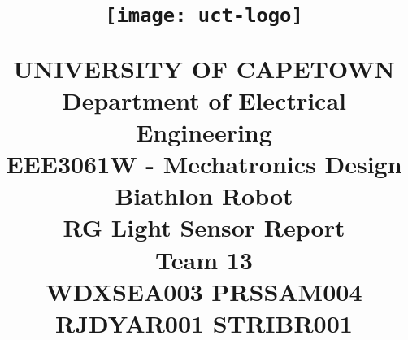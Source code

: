 
\newcommand{\hmwkTitle}{RG Light Sensor Report} %
\newcommand{\hmwkDueDate}{Wednesday,\ September\ 03,\ 2014}                    %
\newcommand{\hmwkClass}{EEE3061W - Mechatronics Design}                    %
\newcommand{\hmwkClassTime}{10:30am}                                 %
\newcommand{\hmwkClassInstructor}{Jones}                               %
\newcommand{\hmwkAuthorName}{Team 13}    %
\newcommand{\hmwkDepartment}{Department of Electrical Engineering}           %


\title{
\begin{figure}[H]
  \begin{center}
    \texttt{[image: uct-logo]}
  \end{center}
\end{figure}
\textmd{\Huge UNIVERSITY OF CAPETOWN \\ \LARGE \hmwkDepartment} \\
\vspace{2in}
\textmd{\textbf{\LARGE \hmwkClass \\ \Huge Biathlon Robot \\ \hmwkTitle \\ \vspace{1.5in} \Large Team 13 \\  WDXSEA003 \textbar\space PRSSAM004 \textbar\space RJDYAR001 \textbar\space STRIBR001}}\\
}

\date{}




